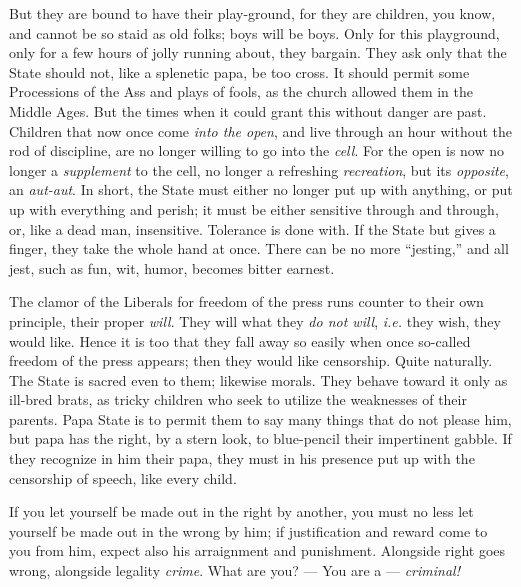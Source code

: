 But they are bound to have their play-ground, for they are children, you know, 
and cannot be so staid as old folks; boys will be boys. Only for this 
playground, only for a few hours of jolly running about, they bargain. They 
ask only that the State should not, like a splenetic papa, be too cross. It 
should permit some Processions of the Ass and plays of fools, as the church 
allowed them in the Middle Ages. But the times when it could grant this 
without danger are past. Children that now once come \textit{into the open}, 
and live through an hour without the rod of discipline, are no longer willing 
to go into the \textit{cell}. For the open is now no longer a 
\textit{supplement} to the cell, no longer a refreshing \textit{recreation}, 
but its \textit{opposite}, an \textit{aut-aut}. In short, the State must 
either no longer put up with anything, or put up with everything and perish; 
it must be either sensitive through and through, or, like a dead man, 
insensitive. Tolerance is done with. If the State but gives a finger, they 
take the whole hand at once. There can be no more ``jesting,'' and all jest, 
such as fun, wit, humor, becomes bitter earnest.

The clamor of the Liberals for freedom of the press runs counter to their own 
principle, their proper \textit{will}. They will what they \textit{do not 
will}, \textit{i.e.} they wish, they would like. Hence it is too that they 
fall away so easily when once so-called freedom of the press appears; then 
they would like censorship. Quite naturally. The State is sacred even to them; 
likewise morals. They behave toward it only as ill-bred brats, as tricky 
children who seek to utilize the weaknesses of their parents. Papa State is to 
permit them to say many things that do not please him, but papa has the right, 
by a stern look, to blue-pencil their impertinent gabble. If they recognize in 
him their papa, they must in his presence put up with the censorship of 
speech, like every child.

\myhrule


If you let yourself be made out in the right by another, you must no less let 
yourself be made out in the wrong by him; if justification and reward come to 
you from him, expect also his arraignment and punishment. Alongside right goes 
wrong, alongside legality \textit{crime}. What are you? --- You are a --- \textit{criminal!}

